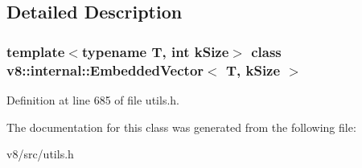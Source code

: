 \subsection{Detailed Description}
\subsubsection*{template$<$typename T, int k\+Size$>$\newline
class v8\+::internal\+::\+Embedded\+Vector$<$ T, k\+Size $>$}



Definition at line 685 of file utils.\+h.



The documentation for this class was generated from the following file\+:\begin{DoxyCompactItemize}
\item 
v8/src/utils.\+h\end{DoxyCompactItemize}
